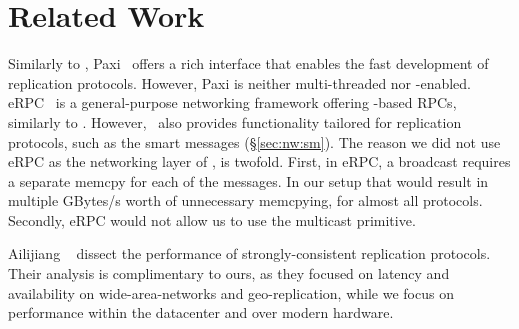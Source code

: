 \section{Related Work}
\label{sec:related}

Similarly to \odlib, 
Paxi~\cite{Ailijiang:2019} offers a rich interface that enables the fast development of replication protocols. However, Paxi is neither multi-threaded nor \RDMA-enabled.
eRPC~\cite{Kalia:2019} is a general-purpose networking framework offering \RDMA-based RPCs, similarly to \odlib.
However, \odlib\ also provides functionality tailored for replication protocols, such as the smart messages (\S\ref{sec:nw:sm}). 
The reason we did not use eRPC as the networking layer of \odlib, is twofold. 
First, in eRPC, a broadcast requires a separate memcpy for each of the messages. 
In our setup that would result in multiple GBytes/s worth of unnecessary memcpying, for almost all protocols.
Secondly, eRPC would not allow us to use the multicast primitive.



Ailijiang \etal~\cite{Ailijiang:2019} dissect the performance of strongly-consistent replication protocols. Their analysis is complimentary to ours, as they focused on latency and availability on wide-area-networks and geo-replication, while we focus on performance within the datacenter and over modern hardware.

